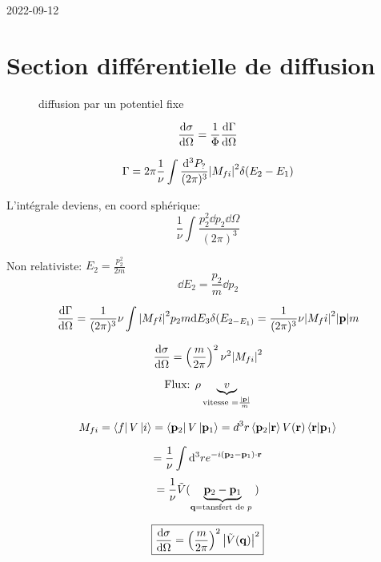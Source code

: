 


2022-09-12
\section*{Section différentielle de diffusion}


\begin{figure}[ht]
    \centering
    \caption{diffusion par un potentiel fixe}
    \label{fig:diffusion-par-un-potentiel-fixe}
\end{figure}



$$\dv{\sigma}{\Omega} = \frac{1}{\Phi} \dv{\Gamma}{\Omega} $$ 

$$\Gamma = 2\pi \frac{1}{\nu} \int \frac{\dd ^3 P_? }{(2\pi)^3} \abs{M_{fi} }^{2} \delta(E_2-E_1 ) $$ 

L'intégrale deviens, en coord sphérique: $$\frac{1}{\nu} \int_{}^{} \frac{p_2^{2}\dd p_2 \dd \Omega}{(2\pi)^3   } $$ 

Non relativiste: $E_2 = \frac{p_2^{2}}{2m} $ 
$$\dd E_2 = \frac{p_2}{m} \dd p_2$$ 


$$\dv{\Gamma}{\Omega} = \frac{1}{(2\pi)^3} \nu \int \abs{M_fi}^{2} p_2 m \dd E_3 \delta(E_{2-E_1)} = \frac{1}{(2\pi)^3} \nu \abs{M_fi}^{2}\abs{\vb{p}} m $$ 


$$\dv{\sigma}{\Omega} = \left( \frac{m}{2\pi}  \right)^2 \nu^{2}\abs{M_{fi} }^{2}$$ 

$$\text{Flux: }\rho \underbrace{v}_{\text{vitesse } = \frac{\abs{\vb{p}}}{m}   }   $$ 

$$M_{fi} = \bra{f} V \ket{i} = \bra{\vb{p}_2} V \ket{\vb{p}_1} = d^{3}r \bra{\vb{p}_2}\ket{\vb{r}} V(\vb{r})\bra{\vb{r}}\ket{\vb{p}_1}$$ 

$$= \frac{1}{\nu} \int \dd^{3}r e^{-i(\vb{p}_2 -\vb{p}_1 ) \cdot \vb{r}}$$ 
$$= \frac{1}{\nu} \tilde V (\underbrace{\vb{p}_2 - \vb{p}_1 }_{\vb{q} =\text{tansfert de $p$ } } )$$ 


$$\boxed{\dv{\sigma}{\Omega} = \left( \frac{m}{2\pi}  \right) ^2 \abs{\tilde V(\vb{q})}^{2}}$$ 

